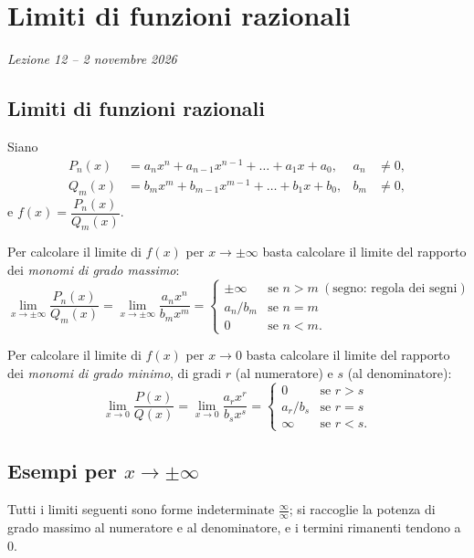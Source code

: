 \documentclass[11pt,a4paper]{article}
\begin{document}
\section[Limiti di funzioni razionali (Lezione 12 -- 2 novembre 2026)]{Limiti di funzioni razionali}
\noindent\emph{Lezione 12 -- 2 novembre 2026}
\subsection{Limiti di funzioni razionali}

Siano
\[
\begin{aligned} P_n(x) &= a_n x^n + a_{n-1}x^{n-1} + \dots + a_1 x + a_0, & a_n &\neq 0, \\ Q_m(x) &= b_m x^m + b_{m-1}x^{m-1} + \dots + b_1 x + b_0, & b_m &\neq 0 , \end{aligned}
\]
e $f(x) = \dfrac{P_n(x)}{Q_m(x)}$.

\begin{proprieta}
Per calcolare il limite di $f(x)$ per $x \to \pm\infty$ basta calcolare il limite del rapporto dei \emph{monomi di grado massimo}:
\[
\lim_{x\to\pm\infty}\frac{P_n(x)}{Q_m(x)} = \lim_{x\to\pm\infty}\frac{a_n x^n}{b_m x^m} =
\begin{cases} \pm\infty & \text{se } n > m \ (\text{segno: regola dei segni}) \\ a_n/b_m & \text{se } n = m \\ 0 & \text{se } n < m . \end{cases}
\]
\end{proprieta}

\begin{proprieta}
Per calcolare il limite di $f(x)$ per $x \to 0$ basta calcolare il limite del rapporto dei \emph{monomi di grado minimo}, di gradi $r$ (al numeratore) e $s$ (al denominatore):
\[
\lim_{x\to 0}\frac{P(x)}{Q(x)} = \lim_{x\to 0}\frac{a_r x^r}{b_s x^s} =
\begin{cases} 0 & \text{se } r > s \\ a_r/b_s & \text{se } r = s \\ \infty & \text{se } r < s . \end{cases}
\]
\end{proprieta}

\subsection{Esempi per $x \to \pm\infty$}

Tutti i limiti seguenti sono forme indeterminate $\frac{\infty}{\infty}$; si raccoglie la potenza di grado massimo al numeratore e al denominatore, e i termini rimanenti tendono a $0$.
\end{document}
